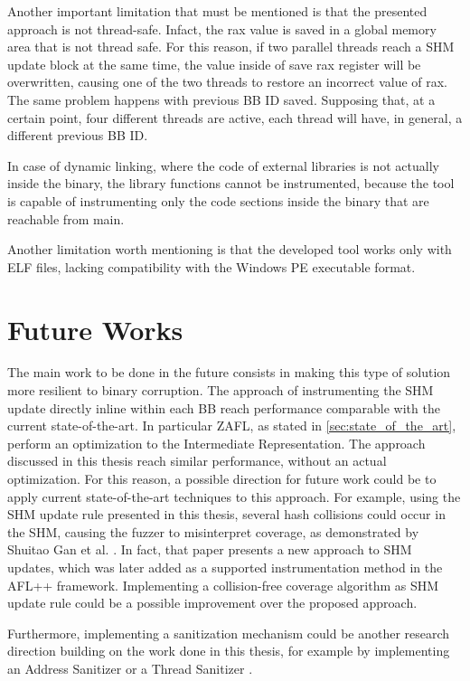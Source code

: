     Another important limitation that must be mentioned is that the presented approach is not thread-safe.
    Infact, the rax value is saved in a global memory area that is not thread safe.
    For this reason, if two parallel threads reach a \gls{SHM} update block at the same time, the value inside of save 
    rax register will be overwritten, causing one of the two threads to restore an incorrect value of rax.
    The same problem happens with previous \gls{BB} ID saved.
    Supposing that, at a certain point, four different threads are active, each thread will have, in general, a different 
    previous \gls{BB} ID.

    In case of dynamic linking, where the code of external libraries is not actually inside the binary, the library functions 
    cannot be instrumented, because the tool is capable of instrumenting only the code sections 
    inside the binary that are reachable from main.

    Another limitation worth mentioning is that the developed tool works only with \gls{ELF} files, lacking 
    compatibility with the Windows PE executable format.

\section{Future Works}
    The main work to be done in the future consists in making this type of solution more resilient to binary corruption.
    The approach of instrumenting the \gls{SHM} update directly inline within each \gls{BB} reach performance comparable 
    with the current state-of-the-art. 
    In particular ZAFL, as stated in \cref{sec:state_of_the_art}, perform an optimization to the Intermediate Representation.
    The approach discussed in this thesis reach similar performance, without an actual optimization.
    For this reason, a possible direction for future work could be to apply current state-of-the-art techniques 
    to this approach.
    For example, using the \gls{SHM} update rule presented in this thesis, several hash collisions could occur in the 
    \gls{SHM}, causing the fuzzer to misinterpret coverage, as demonstrated by Shuitao Gan et al. \cite{CollAFL}.
    In fact, that paper presents a new approach to \gls{SHM} updates, which was later added as a supported 
    instrumentation method in the AFL++ framework. Implementing a collision-free coverage algorithm as 
    \gls{SHM} update rule could be a possible improvement over the proposed approach.

    Furthermore, implementing a sanitization mechanism could be another research direction building on the work 
    done in this thesis, for example by implementing an Address Sanitizer \cite{serebryany2012addresssanitizer} 
    or a Thread Sanitizer \cite{schilling2024binary}.
